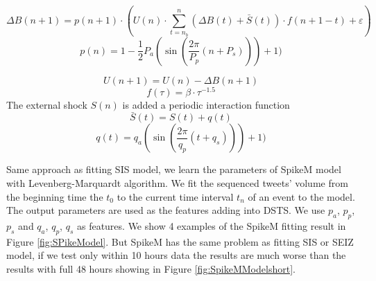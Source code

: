 \begin{equation}
\Delta B(n + 1) =p(n + 1)\cdot( U(n) \cdot  \sum ^n_{t=n_b}(\Delta B(t) +  \bar{S}(t))\cdot f(n+1-t) + \varepsilon )
\end{equation}
\begin{equation}
\label{periodic}
p(n) = 1-\frac{1}{2}P_a(\sin (\frac{2\pi}{P_p} (n+P_s)))+1)
\end{equation}

\begin{equation}
U(n + 1)=U(n)-\Delta {B(n + 1) }
\end{equation}
\begin{equation}
\label{decay}
f(\tau)=\beta \cdot \tau ^{-1.5}
\end{equation}
The external shock $S(n)$ is added a periodic interaction function
\begin{equation}
\label{outs}
\bar{S}(t)=S(t)+q(t)
\end{equation}
\begin{equation}
q(t) =  q_a(\sin (\frac{2\pi}{q_p} (t+q_s)))+1)
\end{equation}


\begin{table}[!h]
 \centering
{}
\caption{New Parameters of Extended SpikeM}
\label{tab:Features_Impsortance2}
\end{table}
Same approach as fitting SIS model, we learn the parameters of SpikeM model with Levenberg-Marquardt algorithm. We fit the sequenced tweets' volume from the beginning time the $t_0$ to the current time interval $t_n$ of an event to the model. The output parameters are used as the features adding into DSTS. We use $p_a$,  $p_p$, $p_s$ and $q_a$, $q_p$, $q_s$ as features. We show 4 examples of the SpikeM fitting result in Figure \ref{fig:SPikeModel}. But SpikeM has the same problem as fitting SIS or SEIZ model, if we test only within 10 hours data the results are much worse than the results with full 48 hours showing in Figure \ref{fig:SpikeMModelshort}.

